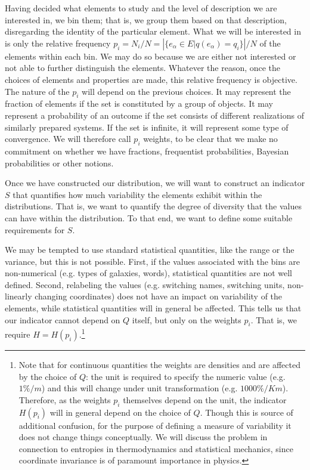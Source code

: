\documentclass{article}
\begin{document}
Having decided what elements to study and the level of description we are interested in, we bin them; that is, we group them based on that description, disregarding the identity of the particular element. What we will be interested in is only the relative frequency $p_i = N_i / N = \left| \{e_\alpha \in E | q(e_\alpha) = q_i \} \right| / N$ of the elements within each bin. We may do so because we are either not interested or not able to further distinguish the elements. Whatever the reason, once the choices of elements and properties are made, this relative frequency is objective. The nature of the $p_i$ will depend on the previous choices. It may represent the fraction of elements if the set is constituted by a group of objects. It may represent a probability of an outcome if the set consists of different realizations of similarly prepared systems. If the set is infinite, it will represent some type of convergence. We will therefore call $p_i$ weights, to be clear that we make no commitment on whether we have fractions, frequentist probabilities, Bayesian probabilities or other notions.

Once we have constructed our distribution, we will want to construct an indicator $S$ that quantifies how much variability the elements exhibit within the distributions. That is, we want to quantify the degree of diversity that the values can have within the distribution. To that end, we want to define some suitable requirements for $S$.

We may be tempted to use standard statistical quantities, like the range or the variance, but this is not possible. First, if the values associated with the bins are non-numerical (e.g. types of galaxies, words), statistical quantities are not well defined. Second, relabeling the values (e.g. switching names, switching units, non-linearly changing coordinates) does not have an impact on variability of the elements, while statistical quantities will in general be affected. This tells us that our indicator cannot depend on $Q$ itself, but only on the weights $p_i$. That is, we require $H=H(p_i)$.\footnote{Note that for continuous quantities the weights are densities and are affected by the choice of $Q$: the unit is required to specify the numeric value (e.g. $1 \% / m$) and this will change under unit transformation (e.g. $1000 \% / Km$). Therefore, as the weights $p_i$ themselves depend on the unit, the indicator $H(p_i)$ will in general depend on the choice of $Q$. Though this is source of additional confusion, for the purpose of defining a measure of variability it does not change things conceptually. We will discuss the problem in connection to entropies in thermodynamics and statistical mechanics, since coordinate invariance is of paramount importance in physics.}
\end{document}
